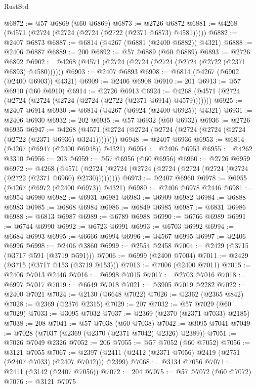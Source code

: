 \begin{lexlean}{RustStd}
\begin{coremodule}
@6872 := @57 @6869 (@60 @6869)
@6873 := @2726 @6872
@6881 := @4268 (@4571 (@2724 (@2724 (@2724 (@2722 (@2371 @6873) @4581)))))
@6882 := @2407 @6873
@6887 := @6814 (@4267 (@6881 (@2400 @6882)) @4321)
@6888 := @2406 @6887
@6889 := 200
@6892 := @57 @6889 (@60 @6889)
@6893 := @2726 @6892
@6902 := @4268 (@4571 (@2724 (@2724 (@2724 (@2724 (@2722 (@2371 @6893) @4580))))))
@6903 := @2407 @6893
@6908 := @6814 (@4267 (@6902 (@2400 @6903)) @4321)
@6909 := @2406 @6908
@6910 := 201
@6913 := @57 @6910 (@60 @6910)
@6914 := @2726 @6913
@6924 := @4268 (@4571 (@2724 (@2724 (@2724 (@2724 (@2724 (@2722 (@2371 @6914) @4579)))))))
@6925 := @2407 @6914
@6930 := @6814 (@4267 (@6924 (@2400 @6925)) @4321)
@6931 := @2406 @6930
@6932 := 202
@6935 := @57 @6932 (@60 @6932)
@6936 := @2726 @6935
@6947 := @4268 (@4571 (@2724 (@2724 (@2724 (@2724 (@2724 (@2724 (@2722 (@2371 @6936) @3241))))))))
@6948 := @2407 @6936
@6953 := @6814 (@4267 (@6947 (@2400 @6948)) @4321)
@6954 := @2406 @6953
@6955 := @4262 @3310
@6956 := 203
@6959 := @57 @6956 (@60 @6956)
@6960 := @2726 @6959
@6972 := @4268
    (@4571 (@2724 (@2724 (@2724 (@2724 (@2724 (@2724 (@2724 (@2722 (@2371 @6960) @2730)))))))))
@6973 := @2407 @6960
@6978 := @6955 (@4267 (@6972 (@2400 @6973)) @4321)
@6980 := @2406 @6978 @2446
@6981 := @6954 @6980
@6982 := @6931 @6981
@6983 := @6909 @6982
@6984 := @6888 @6983
@6985 := @6868 @6984
@6986 := @6849 @6985
@6987 := @6831 @6986
@6988 := @6813 @6987
@6989 := @6789 @6988
@6990 := @6766 @6989
@6991 := @6744 @6990
@6992 := @6723 @6991
@6993 := @6703 @6992
@6994 := @6684 @6993
@6995 := @6666 @6994
@6996 := @4567 @6995
@6997 := @2406 @6996
@6998 := @2406 @3860
@6999 := @2554 @2458
@7004 := @2429 (@3715 (@3717 @591 (@3719 @591)))
@7006 := @6999 (@2400 @7004)
@7011 := @2429 (@3715 (@3717 @153 (@3719 @153)))
@7013 := @7006 (@2400 @7011)
@7015 := @2406 @7013 @2446
@7016 := @6998 @7015
@7017 := @2703 @7016
@7018 := @6997 @7017
@7019 := @6649 @7018
@7021 := @3905 @7019 @2282
@7022 := @2400 @7021
@7024 := @2130 (@6648 @7022)
@7026 := @2362 (@2365 @842)
@7028 := @2369 (@2376 @2315)
@7029 := 207
@7032 := @57 @7029 (@60 @7029)
@7033 := @3095 @7032
@7037 := @2369 (@2370 (@2371 @7033) @2185)
@7038 := 208
@7041 := @57 @7038 (@60 @7038)
@7042 := @3095 @7041
@7049 := @7028 (@7037 (@2369 (@2370 (@2371 @7042) @2326) @2389))
@7051 := @7026 @7049 @2326
@7052 := 206
@7055 := @57 @7052 (@60 @7052)
@7056 := @3121 @7055
@7067 := @2397 (@2411 (@2412 (@2371 @7056) @2419 (@2751 (@2407 @7033) (@2407 @7042))) @2399)
@7068 := @3134 @7056
@7071 := @2411 (@3142 (@2407 @7056))
@7072 := 204
@7075 := @57 @7072 (@60 @7072)
@7076 := @3121 @7075

\end{coremodule}
\end{lexlean}
